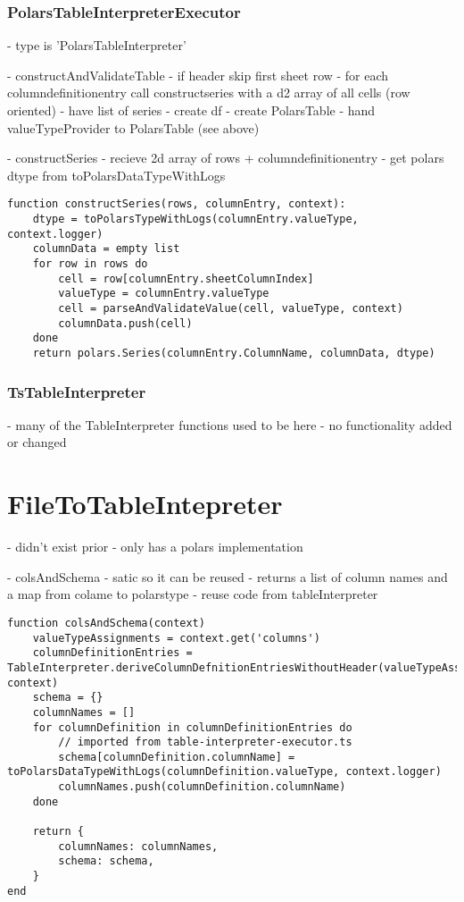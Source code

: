 \subsubsection{PolarsTableInterpreterExecutor}
\label{subsubsection:polarstableinterpreterexecutor}
- type is 'PolarsTableInterpreter'

- constructAndValidateTable
- if header skip first sheet row
- for each columndefinitionentry call constructseries with a d2 array of all cells (row oriented)
- have list of series
- create df
- create PolarsTable
- hand valueTypeProvider to PolarsTable (see above)

- constructSeries
- recieve 2d array of rows + columndefinitionentry
- get polars dtype from toPolarsDataTypeWithLogs
\begin{listing}
	\begin{verbatim}
function constructSeries(rows, columnEntry, context):
	dtype = toPolarsTypeWithLogs(columnEntry.valueType, context.logger)
	columnData = empty list
	for row in rows do
		cell = row[columnEntry.sheetColumnIndex]
		valueType = columnEntry.valueType
		cell = parseAndValidateValue(cell, valueType, context)
		columnData.push(cell)
	done
	return polars.Series(columnEntry.ColumnName, columnData, dtype)
	\end{verbatim}
	\caption{}
	\label{lst:polarsTableInterpreter:constructSeries}
\end{listing}

\subsubsection{TsTableInterpreter}
- many of the TableInterpreter functions used to be here
- no functionality added or changed

\section{FileToTableIntepreter}
- didn't exist prior
- only has a polars implementation

- colsAndSchema
- satic so it can be reused
- returns a list of column names and a map from colame to polarstype
- reuse code from tableInterpreter
\begin{listing}
	\begin{verbatim}
function colsAndSchema(context)
	valueTypeAssignments = context.get('columns')
	columnDefinitionEntries = TableInterpreter.deriveColumnDefnitionEntriesWithoutHeader(valueTypeAssignments, context)
	schema = {}
	columnNames = []
	for columnDefinition in columnDefinitionEntries do
		// imported from table-interpreter-executor.ts
		schema[columnDefinition.columnName] = toPolarsDataTypeWithLogs(columnDefinition.valueType, context.logger)
		columnNames.push(columnDefinition.columnName)
	done

	return {
		columnNames: columnNames,
		schema: schema,
	}
end
	\end{verbatim}
\end{listing}

